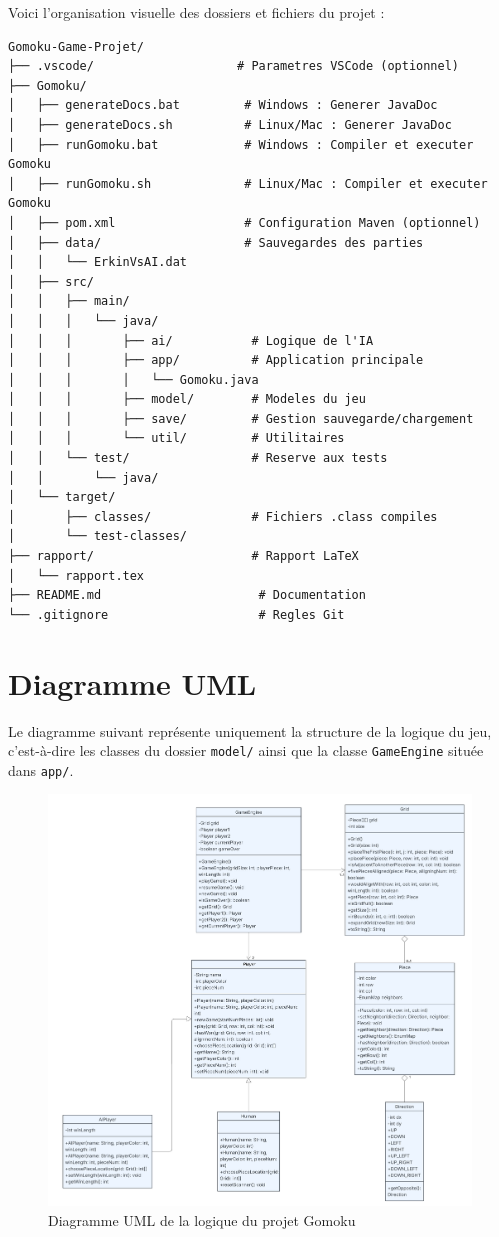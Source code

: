 \documentclass[a4paper,11pt]{article}
\begin{document}
Voici l'organisation visuelle des dossiers et fichiers du projet :

\begin{lstlisting}[style=tree]
Gomoku-Game-Projet/
├── .vscode/                    # Parametres VSCode (optionnel)
├── Gomoku/
│   ├── generateDocs.bat         # Windows : Generer JavaDoc
│   ├── generateDocs.sh          # Linux/Mac : Generer JavaDoc
│   ├── runGomoku.bat            # Windows : Compiler et executer Gomoku
│   ├── runGomoku.sh             # Linux/Mac : Compiler et executer Gomoku
│   ├── pom.xml                  # Configuration Maven (optionnel)
│   ├── data/                    # Sauvegardes des parties
│   │   └── ErkinVsAI.dat
│   ├── src/
│   │   ├── main/
│   │   │   └── java/
│   │   │       ├── ai/           # Logique de l'IA
│   │   │       ├── app/          # Application principale
│   │   │       │   └── Gomoku.java
│   │   │       ├── model/        # Modeles du jeu
│   │   │       ├── save/         # Gestion sauvegarde/chargement
│   │   │       └── util/         # Utilitaires
│   │   └── test/                 # Reserve aux tests
│   │       └── java/
│   └── target/
│       ├── classes/              # Fichiers .class compiles
│       └── test-classes/
├── rapport/                      # Rapport LaTeX
│   └── rapport.tex
├── README.md                      # Documentation
└── .gitignore                     # Regles Git
\end{lstlisting}

\newpage

\section{Diagramme UML}

Le diagramme suivant représente uniquement la structure de la logique du jeu, c'est-à-dire les classes du dossier \texttt{model/} ainsi que la classe \texttt{GameEngine} située dans \texttt{app/}.

\begin{figure}[h!]
    \centering
    \includegraphics[width=1\textwidth]{img/gomoku-UML.png}
    \caption{Diagramme UML de la logique du projet Gomoku}
    \label{fig:uml}
\end{figure}
\end{document}
